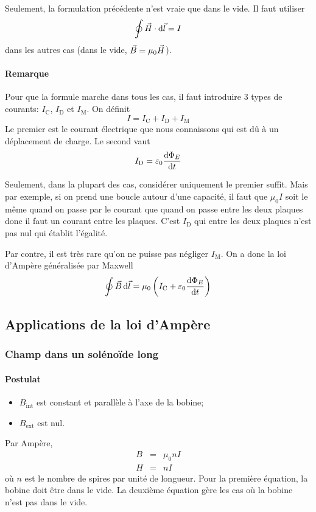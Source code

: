 Seulement, la formulation précédente n'est vraie que dans le vide.
Il faut utiliser
\[ \oint \vec H \cdot \operatorname{d}\! \vec l = I \]
dans les autres cas (dans le vide, $\vec B = \mu_0 \vec H$).

\paragraph{Remarque}
Pour que la formule marche dans tous les cas, il faut introduire 3 types de courants:
$I_\mathrm{C}$, $I_\mathrm{D}$ et $I_\mathrm{M}$.
On définit
\[ I = I_\mathrm{C} + I_\mathrm{D} + I_\mathrm{M} \]
Le premier est le courant électrique que nous connaissons qui est dû à un déplacement de charge.
Le second vaut
\[ I_\mathrm{D} = \varepsilon_0\frac{\operatorname{d}\! \Phi_E}{\operatorname{d}\! t} \]

Seulement, dans la plupart des cas, considérer uniquement le premier suffit.
Mais par exemple, si on prend une boucle autour d'une capacité,
il faut que $\mu_0I$ soit le même quand on passe par le courant que quand on passe entre les deux plaques donc il faut un courant entre les plaques.
C'est $I_\mathrm{D}$ qui entre les deux plaques n'est pas nul qui établit l'égalité.

Par contre, il est très rare qu'on ne puisse pas négliger $I_\mathrm{M}$.
On a donc la loi d'Ampère généralisée par Maxwell
\[ \oint \vec B \operatorname{d}\! \vec l = \mu_0 \left(I_\mathrm{C} + \varepsilon_0 \frac{\operatorname{d}\! \Phi_E}{\operatorname{d}\! t}\right) \]

\subsection{Applications de la loi d'Ampère}
\subsubsection{Champ dans un solénoïde long}
\label{sec:bbl}
\paragraph{Postulat}
\begin{itemize}
	\item $B_\mathrm{int}$ est constant et parallèle à l'axe de la bobine;
	\item $B_\mathrm{ext}$ est nul.
\end{itemize}
Par Ampère,
\begin{eqnarray*}
	B &=& \mu_0nI\\
	H &=& nI
\end{eqnarray*}
où $n$ est le nombre de spires par unité de longueur.
Pour la première équation, la bobine doit être dans le vide.
La deuxième équation gère les cas où la bobine n'est pas dans le vide.

